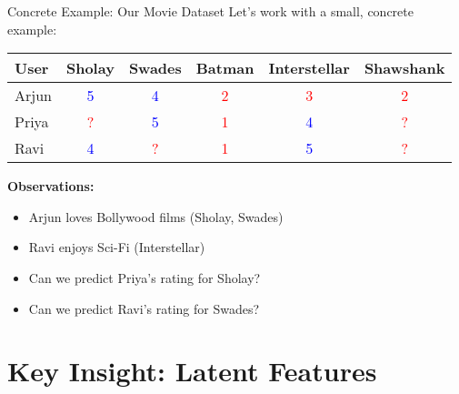 \documentclass{beamer}
\begin{document}
\begin{frame}{Concrete Example: Our Movie Dataset}
Let's work with a small, concrete example:

\pause
\begin{center}
\renewcommand{\arraystretch}{1.2}
\begin{tabular}{l|ccccc}
\toprule
\textbf{User} & \textbf{Sholay} & \textbf{Swades} & \textbf{Batman} & \textbf{Interstellar} & \textbf{Shawshank} \\
\midrule
Arjun & \textcolor{blue}{5} & \textcolor{blue}{4} & \textcolor{red}{2} & \textcolor{red}{3} & \textcolor{red}{2} \\
Priya & \textcolor{red}{?} & \textcolor{blue}{5} & \textcolor{red}{1} & \textcolor{blue}{4} & \textcolor{red}{?} \\
Ravi & \textcolor{blue}{4} & \textcolor{red}{?} & \textcolor{red}{1} & \textcolor{blue}{5} & \textcolor{red}{?} \\
\bottomrule
\end{tabular}
\end{center}

\pause
\textbf{Observations:}
\begin{itemize}[<+->]
    \item Arjun loves Bollywood films (Sholay, Swades) 
    \item Ravi enjoys Sci-Fi (Interstellar)  
    \item Can we predict Priya's rating for Sholay?
    \item Can we predict Ravi's rating for Swades?
\end{itemize}
\end{frame}

\section{Key Insight: Latent Features}
\end{document}
